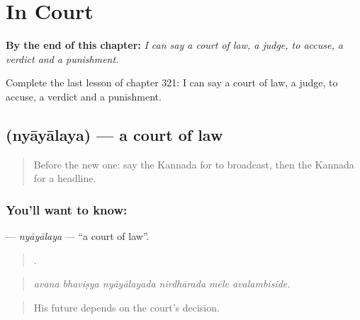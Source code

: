 
\chapter{In Court}
\label{ch:ka-in-court}

\begin{chapteropening}
\textbf{By the end of this chapter:} \emph{I can say a court of law, a judge, to accuse, a verdict and a punishment.}

Complete the last lesson of chapter 321: I can say a court of law, a judge, to accuse, a verdict and a punishment.
\end{chapteropening}

\section[\texorpdfstring{\kn{ನ್ಯಾಯಾಲಯ} (nyāyālaya)}{ನ್ಯಾಯಾಲಯ (nyāyālaya)}]{ (nyāyālaya) — a court of law}

\label{lesson:KA-C321-nyayalaya}



\begin{quote}
Before the new one: say the Kannada for to broadcast, then the Kannada for a headline.
\end{quote}

\subsection*{You'll want to know: }
\textbf{} — \emph{nyāyālaya} — \textquotedblleft{}a court of law\textquotedblright{}.

\begin{quote}
     .
\end{quote}

\begin{quote}
\emph{avana bhaviṣya nyāyālayada nirdhārada mēle avalambiside.}
\end{quote}

\begin{quote}
His future depends on the court's decision.
\end{quote}

